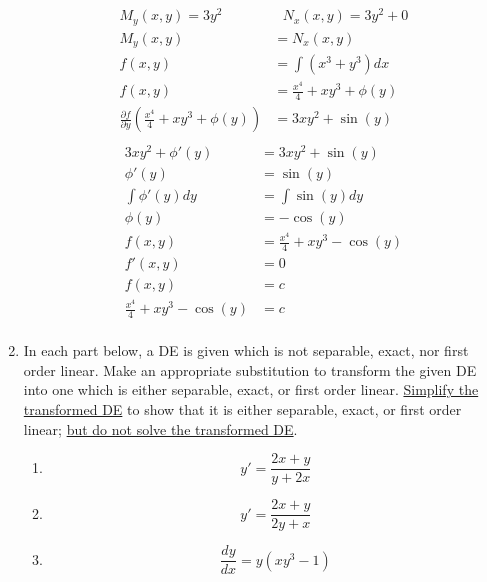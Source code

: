 \documentclass[12pt]{report}
\newcommand{\sep}{\mbox{   } & \mbox{   }}
\begin{document}
\begin{enumerate}[label=\arabic*.]
{\begin{equation*}
\begin{aligned}
		M_{y}(x,y) = 3y^{2} \sep N_{x}(x,y) = 3y^{2} + 0\\
		M_{y}(x,y) &= N_{x}(x,y)\\
		f(x, y) &= \int (x^{3} + y^{3}) dx\\
		f(x, y) &= \frac{x^{4}}{4} + xy^{3} + \phi(y)\\
		\frac{\partial f}{\partial y}\left( \frac{x^{4}}{4} + xy^{3} + \phi(y) \right) &= 3xy^{2} + \sin(y)\\
	\end{aligned}
	\end{equation*}\begin{equation*}
	\begin{aligned}
		3xy^{2} + \phi'(y) &= 3xy^{2} + \sin(y)\\
		\phi'(y) &= \sin(y)\\
		\int \phi'(y) dy &= \int \sin(y) dy\\
		\phi(y) &= -\cos(y)\\
		f(x, y) &= \frac{x^{4}}{4} + xy^{3} - \cos(y)\\
		f'(x, y) &= 0\\
		f(x, y) &= c\\
		\frac{x^{4}}{4} + xy^{3} - \cos(y) &= c\\
	\end{aligned}
	\end{equation*}}
	\item In each part below, a DE is given which is not separable, exact, nor first order linear. Make an appropriate substitution to transform the given DE into one which is either separable, exact, or first order linear. \underline{Simplify the transformed DE} to show that it is either separable, exact, or first order linear; \underline{but do not solve the transformed DE}.
	\begin{enumerate}[label=(\roman*)]
	    \item \[ y' = \frac{2x + y}{y + 2x} \]
	    \item \[ y' = \frac{2x + y}{2y + x} \]
		\item \[ \frac{dy}{dx} = y(xy^{3} - 1) \]\answer{\begin{equation*}

\end{equation*}}
\end{enumerate}
\end{enumerate}
\end{document}
